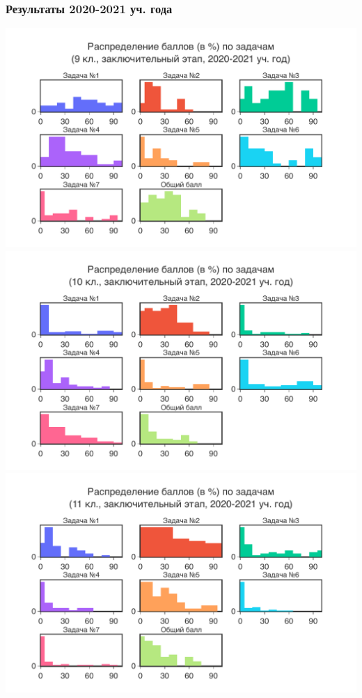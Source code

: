 \subsubsection{Результаты 2020-2021 уч. года}

\includegraphics[width=\linewidth]{../export/pdf/results/2021/respa/grade9-dist-problemwise.pdf}
\includegraphics[width=\linewidth]{../export/pdf/results/2021/respa/grade10-dist-problemwise.pdf}
\includegraphics[width=\linewidth]{../export/pdf/results/2021/respa/grade11-dist-problemwise.pdf}


